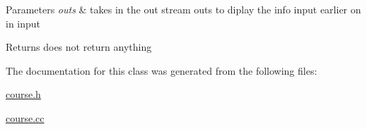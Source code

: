 \begin{DoxyParams}{Parameters}
{\em outs} & takes in the out stream outs to diplay the info input earlier on in input \\
\hline
\end{DoxyParams}
\begin{DoxyReturn}{Returns}
does not return anything 
\end{DoxyReturn}


The documentation for this class was generated from the following files\-:\begin{DoxyCompactItemize}
\item 
\hyperlink{course_8h}{course.\-h}\item 
\hyperlink{course_8cc}{course.\-cc}\end{DoxyCompactItemize}
